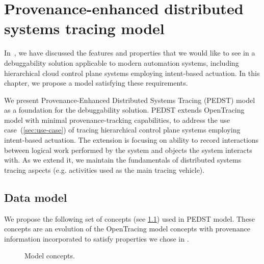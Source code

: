 \newpage
\chapter{Provenance-enhanced distributed systems tracing model}\label{sec:pedst-model}

In~, we have discussed the features and properties that we would like to see in a debuggability solution applicable to modern automation systems, including hierarchical cloud control plane systems employing intent-based actuation. In this chapter, we propose a model satisfying these requirements.

We present Provenance-Enhanced Distributed Systems Tracing (PEDST) model as a foundation for the debuggability solution. PEDST extends OpenTracing model with minimal provenance-tracking capabilities, to address the use case~(\cref{sec:use-case}) of tracing hierarchical control plane systems employing intent-based actuation. The extension is focusing on ability to record interactions between logical work performed by the system and objects the system interacts with. As we extend it, we maintain the fundamentals of distributed systems tracing aspects (e.g. activities used as the main tracing vehicle).

\section{Data model}\label{sec:data-model}

We propose the following set of concepts (see \cref{fig:concepts}) used in PEDST model. These concepts are an evolution of the OpenTracing model concepts with provenance information incorporated to satisfy properties we chose in .

\begin{figure}[t]
    \caption{Model concepts.}
    \centering
{}
    \label{fig:concepts}
\end{figure}

